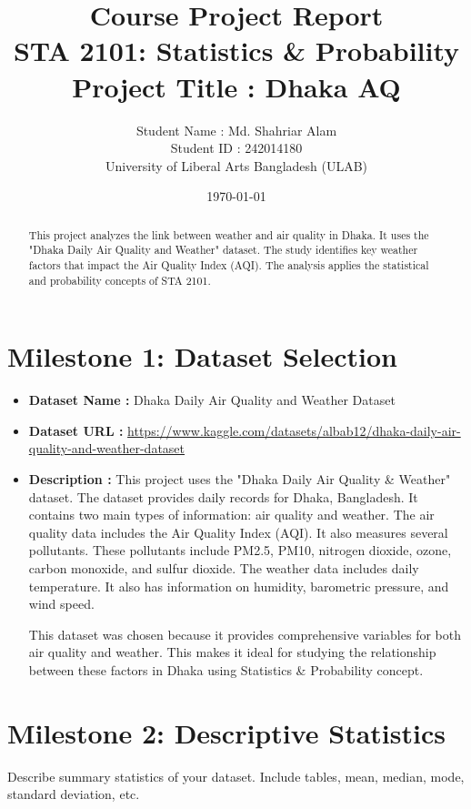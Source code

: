 \documentclass[12pt,a4paper]{article}
\title{\textbf{Course Project Report}\\STA 2101: Statistics \& Probability \\ [1em] 
Project Title : Dhaka AQ
}
\author{Student Name : Md. Shahriar Alam \\
Student ID : 242014180\\
University of Liberal Arts Bangladesh (ULAB)}
\date{\today}
\begin{document}
\maketitle
\onehalfspacing

\begin{abstract} 
This project analyzes the link between weather and air quality in Dhaka. It uses the "Dhaka Daily Air Quality and Weather" dataset. The study identifies key weather factors that impact the Air Quality Index (AQI). The analysis applies the statistical and probability concepts of STA 2101. 
\end{abstract}

\tableofcontents
\newpage

\section{Milestone 1: Dataset Selection}
\begin{itemize}
    \item \textbf{Dataset Name :} Dhaka Daily Air Quality and Weather Dataset
    \item \textbf{Dataset URL : } \url{https://www.kaggle.com/datasets/albab12/dhaka-daily-air-quality-and-weather-dataset}
    \item \textbf{Description :} This project uses the "Dhaka Daily Air Quality \& Weather" dataset. The dataset provides daily records for Dhaka, Bangladesh. It contains two main types of information: air quality and weather. The air quality data includes the Air Quality Index (AQI). It also measures several pollutants. These pollutants include PM2.5, PM10, nitrogen dioxide, ozone, carbon monoxide, and sulfur dioxide. The weather data includes daily temperature. It also has information on humidity, barometric pressure, and wind speed. 

    This dataset was chosen because it provides comprehensive variables for both air quality and weather. This makes it ideal for studying the relationship between these factors in Dhaka using Statistics \& Probability concept.
\end{itemize}

\section{Milestone 2: Descriptive Statistics}
Describe summary statistics of your dataset. Include tables, mean, median, mode, standard deviation, etc.
\end{document}
